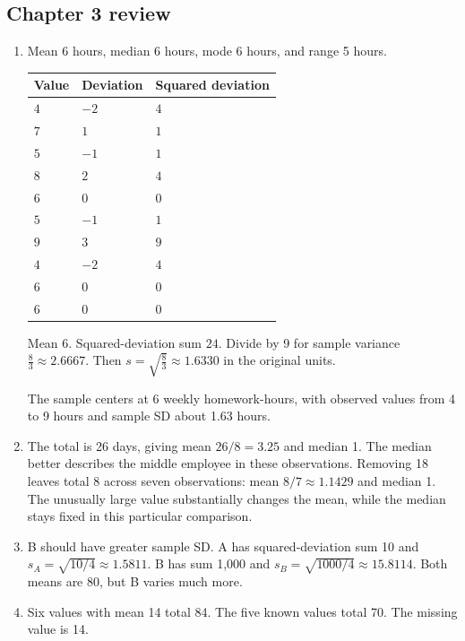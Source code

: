 \subsection*{Chapter 3 review}
\begin{enumerate}[label=R\arabic*.,leftmargin=2.5em,itemsep=10pt]
\item Mean 6 hours, median 6 hours, mode 6 hours, and range 5 hours.
\par\medskip\noindent\begin{minipage}{\linewidth}\par{\small\renewcommand{\arraystretch}{1.2}\begin{tabularx}{\linewidth}{@{}YYY@{}}\toprule
Value & Deviation & Squared deviation\\\midrule
$4$ & $-2$ & $4$\\
$7$ & $1$ & $1$\\
$5$ & $-1$ & $1$\\
$8$ & $2$ & $4$\\
$6$ & $0$ & $0$\\
$5$ & $-1$ & $1$\\
$9$ & $3$ & $9$\\
$4$ & $-2$ & $4$\\
$6$ & $0$ & $0$\\
$6$ & $0$ & $0$\\
\bottomrule\end{tabularx}}\par\medskip
Mean $6$. Squared-deviation sum $24$. Divide by 9 for sample variance $\frac{8}{3}\approx 2.6667$. Then $s=\sqrt{\frac{8}{3}}\approx 1.6330$ in the original units.\par\end{minipage}\par\medskip
The sample centers at 6 weekly homework-hours, with observed values from 4 to 9 hours and sample SD about 1.63 hours.
\item The total is 26 days, giving mean $26/8=3.25$ and median 1. The median better describes the middle employee in these observations. Removing 18 leaves total 8 across seven observations: mean $8/7\approx1.1429$ and median 1. The unusually large value substantially changes the mean, while the median stays fixed in this particular comparison.
\item B should have greater sample SD. A has squared-deviation sum 10 and $s_A=\sqrt{10/4}\approx1.5811$. B has sum 1,000 and $s_B=\sqrt{1000/4}\approx15.8114$. Both means are 80, but B varies much more.
\item Six values with mean 14 total 84. The five known values total 70. The missing value is 14.

\end{enumerate}
